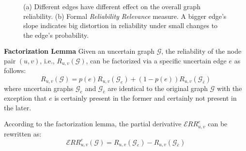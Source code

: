 \begin{figure}
  \vspace{-1em}
    \vspace{-1em}
    \caption{(a) Different edges have different effect on the overall graph reliability. (b) Formal {\em Reliability Relevance } measure. A bigger edge's slope indicates  
     big distortion in reliability under small changes to the edge's probability.}
    \vspace{-0.5em}
\end{figure}


\begin{lemma}
    \textbf{Factorization Lemma}
       Given an uncertain graph $\mathcal{G}$, the reliability of the node pair $(u,v)$, i.e., $R_{u,v}(\mathcal{G})$, can be factorized via a specific uncertain edge $e$ as follows:
    \begin{equation*}
        R_{u,v}(\mathcal{G}) = p(e) R_{u,v} (\mathcal{G}_{e}) + (1-p(e)) R_{u,v} (\mathcal{G}_{\bar{e}} ) 
        \label{eq:fac}
    \end{equation*}
    where uncertain graphs $\mathcal{G}_{e}$ and  $\mathcal{G}_{\bar{e}}$ are identical to the original graph $\mathcal{G}$ with the 
    exception that $e$ is certainly present in the former and certainly not present in the later. 
\end{lemma}


According to the factorization lemma, the partial derivative $\mathcal{E}RR^{e}_{u,v}$ can be rewritten as: 
\begin{equation*}
    \mathcal{E}RR^{e}_{u,v}(\mathcal{G}) = R_{u,v}(\mathcal{G}_{e})-R_{u,v}(\mathcal{G}_{\bar{e}})
\end{equation*}

